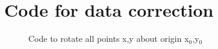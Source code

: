 \documentclass[../main.tex]{subfiles}
\begin{document}

\chapter{Code for data correction}    \label{appendix:code}

	\begin{figure}[ht]
		\centering
        
		\caption{Code to rotate all points x,y about origin x$_{0}$,y$_{0}$}
		\label{code:rotate_xy}
	\end{figure}





\end{document}
